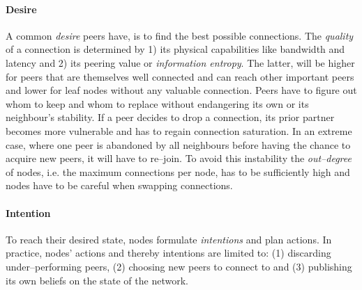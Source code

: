 \paragraph{Desire}\label{par:bdi-desire}
A common \textit{desire} peers have, is to find the best possible connections. The \textit{quality} of a connection is determined by 1) its physical capabilities like bandwidth and latency and 2) its peering value or \textit{information entropy}. The latter, will be higher for peers that are themselves well connected and can reach other important peers and lower for leaf nodes without any valuable connection.
Peers have to figure out whom to keep and whom to replace without endangering its own or its neighbour's stability. If a peer decides to drop a connection, its prior partner becomes more vulnerable and has to regain connection saturation. In an extreme case, where one peer is abandoned by all neighbours before having the chance to acquire new peers, it will have to re–join. To avoid this instability the \textit{out–degree} of nodes, i.e. the maximum connections per node, has to be sufficiently high and nodes have to be careful when swapping connections.


\paragraph{Intention}\label{par:bdi-intention}
To reach their desired state, nodes formulate \textit{intentions} and plan actions. In practice, nodes' actions and thereby intentions are limited to: (1) discarding under–performing peers, (2) choosing new peers to connect to and (3) publishing its own beliefs on the state of the network.

